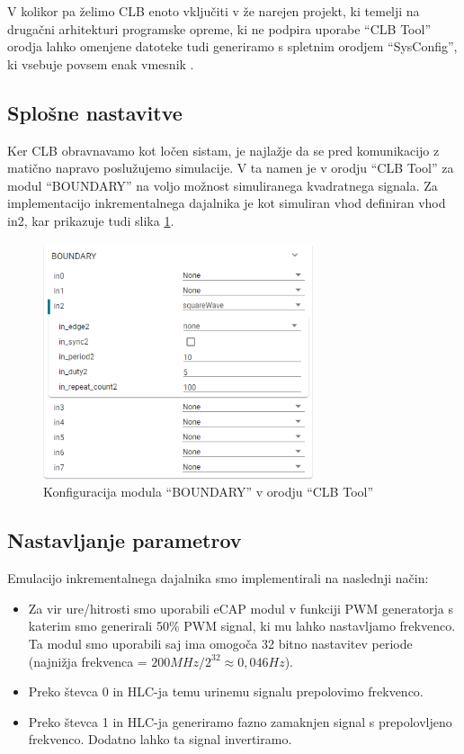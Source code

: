 \documentclass[a4paper]{article}
\begin{document}
\begin{sloppypar}
V kolikor pa želimo CLB enoto vključiti v že narejen projekt, ki temelji na
drugačni arhitekturi programske opreme, ki ne podpira uporabe ``CLB Tool''
orodja lahko omenjene datoteke tudi generiramo s spletnim orodjem
``SysConfig'', ki vsebuje povsem enak vmesnik \cite{sysconfig}.

\subsection{Splošne nastavitve}
Ker CLB obravnavamo kot ločen sistam, je najlažje da se pred komunikacijo z
matično napravo poslužujemo simulacije. V ta namen je v orodju ``CLB Tool'' za
modul ``BOUNDARY'' na voljo možnost simuliranega kvadratnega signala. Za
implementacijo inkrementalnega dajalnika je kot simuliran vhod definiran vhod
in2, kar prikazuje tudi slika \ref{fig:clbtool_boundary}.

\begin{figure}[htb]
    \centerline{\includegraphics[width=8cm]{clbtool_boundary}}
    \caption{Konfiguracija modula ``BOUNDARY'' v orodju ``CLB Tool''}
    \label{fig:clbtool_boundary} 
\end{figure} 

\subsection{Nastavljanje parametrov}\label{sec:nastavljanje_clb}
Emulacijo inkrementalnega dajalnika smo implementirali na naslednji način:
\begin{itemize}
    \item Za vir ure/hitrosti smo uporabili eCAP modul v funkciji PWM
        generatorja s katerim smo generirali 50\% PWM signal, ki mu lahko
        nastavljamo frekvenco. Ta modul smo uporabili saj ima omogoča 32 bitno
        nastavitev periode (najnižja frekvenca = $200 MHz/2^{32} \approx
        0,046 Hz$).
    \item Preko števca 0 in HLC-ja temu urinemu signalu prepolovimo frekvenco.
    \item Preko števca 1 in HLC-ja generiramo fazno zamaknjen signal s
        prepolovljeno frekvenco. Dodatno lahko ta signal invertiramo.
\end{itemize}


\end{sloppypar}
\end{document}
